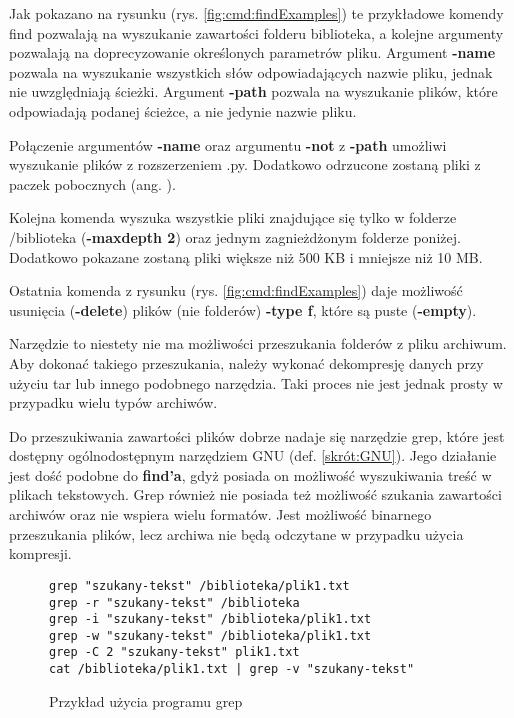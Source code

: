 Jak pokazano na rysunku (rys. \ref{fig:cmd:findExamples}) te przykładowe komendy find
pozwalają na wyszukanie zawartości folderu biblioteka, a kolejne argumenty 
pozwalają na doprecyzowanie określonych parametrów pliku. Argument \textbf{-name}
pozwala na wyszukanie wszystkich słów odpowiadających nazwie pliku, jednak nie
uwzględniają ścieżki. Argument \textbf{-path} pozwala na wyszukanie plików, 
które odpowiadają podanej ścieżce, a nie jedynie nazwie pliku.

Połączenie argumentów \textbf{-name} oraz argumentu \textbf{-not} z \textbf{-path}
umożliwi wyszukanie plików z rozszerzeniem .py. Dodatkowo odrzucone zostaną 
pliki z paczek pobocznych (ang. ).

Kolejna komenda wyszuka wszystkie pliki znajdujące się tylko w folderze 
/biblioteka (\textbf{-maxdepth 2}) oraz jednym zagnieżdżonym folderze poniżej.
Dodatkowo pokazane zostaną pliki większe niż 500 KB i mniejsze niż 10 MB.

Ostatnia komenda z rysunku (rys. \ref{fig:cmd:findExamples}) daje możliwość usunięcia 
(\textbf{-delete}) plików (nie folderów) \textbf{-type f}, które są puste (\textbf{-empty}).

Narzędzie to niestety nie ma możliwości przeszukania folderów z pliku
archiwum. Aby dokonać takiego przeszukania, należy wykonać dekompresję danych
przy użyciu tar lub innego podobnego narzędzia. Taki proces nie jest jednak 
prosty w przypadku wielu typów archiwów.

Do przeszukiwania zawartości plików dobrze nadaje się narzędzie grep, które jest
dostępny ogólnodostępnym narzędziem GNU (def. \ref{skrót:GNU}). Jego działanie jest dość podobne do \textbf{find'a},
gdyż posiada on możliwość wyszukiwania treść w plikach tekstowych. Grep również nie 
posiada też możliwość szukania zawartości archiwów oraz nie wspiera wielu 
formatów. Jest możliwość binarnego przeszukania plików, lecz archiwa nie będą 
odczytane w przypadku użycia kompresji.

\begin{figure}[h]
  \centering
\begin{tcolorbox}[
    colback=white,
    colframe=black,
    boxrule=0.5pt,
    arc=0pt
]
  \begin{verbatim}
grep "szukany-tekst" /biblioteka/plik1.txt 
grep -r "szukany-tekst" /biblioteka 
grep -i "szukany-tekst" /biblioteka/plik1.txt
grep -w "szukany-tekst" /biblioteka/plik1.txt
grep -C 2 "szukany-tekst" plik1.txt
cat /biblioteka/plik1.txt | grep -v "szukany-tekst" 
  \end{verbatim}
\end{tcolorbox}
\caption{Przykład użycia programu grep}
\label{fig:cmd:grepExamples}
\end{figure}

